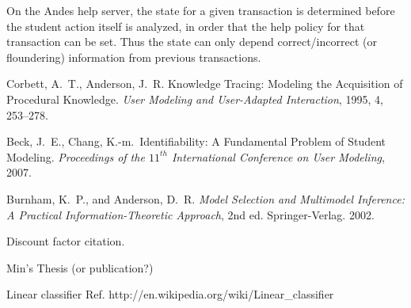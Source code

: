 \documentclass[11pt,letterpaper]{article}
\begin{document}
On the Andes help server, the state for a given transaction 
is determined before the student action itself is analyzed,
in order that the help policy for that transaction can be set.  
Thus the state can only depend correct/incorrect (or floundering) 
information from previous transactions. 

\begin{thebibliography}{9}

  Corbett, A.\ T., Anderson, J.\ R. Knowledge Tracing:  Modeling 
the Acquisition of Procedural Knowledge.  \emph{User Modeling and
 User-Adapted Interaction}, 1995, 4, 253--278.

  Beck, J.\ E., Chang, K.-m.\ Identifiability: A Fundamental Problem of
  Student Modeling.
  \emph{Proceedings of the $11^{th}$ International Conference on User 
    Modeling}, 2007.

Burnham, K.~P., and Anderson, D.~R. \emph{Model
  Selection and Multimodel Inference: A Practical
  Information-Theoretic Approach}, 2nd ed. Springer-Verlag. 2002.


Discount factor citation.

Min's Thesis (or publication?)

Linear classifier Ref. 
     http://en.wikipedia.org/wiki/Linear\_classifier

\end{thebibliography}
\end{document}
